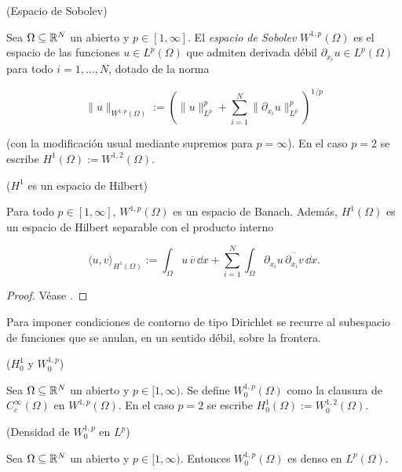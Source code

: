\begin{Definicion}{(Espacio de Sobolev)}
\label{ch:preliminares:def:sobolev}

Sea $\Omega \subseteq \mathbb{R}^N$ un abierto y $p \in [1, \infty]$. El \textit{espacio
de Sobolev} $W^{1,p}(\Omega)$ es el espacio de las funciones
$u \in L^p(\Omega)$ que admiten derivada débil
$\partial_{x_i} u \in L^p(\Omega)$ para todo $i = 1, \ldots, N$, dotado de la
norma

\[\lVert u \rVert_{W^{1,p}(\Omega)} := \left( \lVert u \rVert_{L^p}^p + \sum_{i=1}^N \lVert \partial_{x_i} u \rVert_{L^p}^p \right)^{1/p}\]

(con la modificación usual mediante supremos para $p = \infty$). En el caso
$p = 2$ se escribe $H^1(\Omega) := W^{1,2}(\Omega)$.
\end{Definicion}

\begin{Proposicion}{($H^1$ es un espacio de Hilbert)}
\label{ch:preliminares:prop:H1Hilbert}

Para todo $p \in [1, \infty]$, $W^{1,p}(\Omega)$ es un espacio de Banach. Además,
$H^1(\Omega)$ es un espacio de Hilbert separable con el producto interno

\[\langle u, v \rangle_{H^1(\Omega)} := \int_\Omega u \, \overline{v} \, \dd x + \sum_{i=1}^N \int_\Omega \partial_{x_i} u \, \overline{\partial_{x_i} v} \, \dd x.\]
\end{Proposicion}

\begin{proof}
Véase \cite[Proposición~8.1]{brezis-2011-fun-ana-sob}.
\end{proof}

Para imponer condiciones de contorno de tipo Dirichlet se recurre al subespacio
de funciones que se anulan, en un sentido débil, sobre la frontera.\\

\begin{Definicion}{($H_0^1$ y $W_0^{1,p}$)}
\label{ch:preliminares:def:H01}

Sea $\Omega \subseteq \mathbb{R}^N$ un abierto y $p \in [1, \infty)$. Se define
$W_0^{1,p}(\Omega)$ como la clausura de $C_c^\infty(\Omega)$ en
$W^{1,p}(\Omega)$. En el caso $p = 2$ se escribe
$H_0^1(\Omega) := W_0^{1,2}(\Omega)$.
\end{Definicion}

\begin{Lema}{(Densidad de $W_0^{1,p}$ en $L^p$)}
\label{ch:preliminares:lema:W0denso}

Sea $\Omega \subseteq \mathbb{R}^N$ un abierto y $p \in [1, \infty)$. Entonces
$W_0^{1,p}(\Omega)$ es denso en $L^p(\Omega)$.
\end{Lema}

